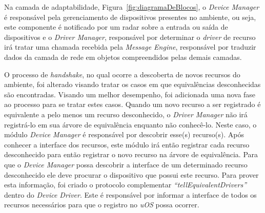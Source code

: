 Na camada de adaptabilidade, Figura~\ref{fig:diagramaDeBlocos}, o \emph{Device Manager} é responsável pela gerenciamento de dispositivos presentes no ambiente, ou seja, este componente é notificado por um radar sobre a entrada ou saída de dispositivos e o \emph{Driver Manager}, responsável por determinar o \emph{driver} de recurso irá tratar uma chamada recebida pela \emph{Message Engine}, responsável por traduzir dados da camada de rede em objetos compreendidos pelas demais camadas.

O processo de \emph{handshake}, no qual ocorre a descoberta de novos recursos do ambiente, foi alterado visando tratar os casos em que equivalências desconhecidas são encontradas. Visando um melhor desempenho, foi adicionada uma nova fase ao processo para se tratar estes casos. Quando um novo recurso a ser registrado é equivalente a pelo menos um recurso desconhecido, o \emph{Driver Manager} não irá registrá-lo em sua árvore de equivalência enquanto não conhecê-lo. Neste caso, o módulo \emph{Device Manager} é responsável por descobrir esse(s) recurso(s). Após conhecer a interface dos recursos, este módulo irá então registrar cada recurso desconhecido para então registrar o novo recurso na árvore de equivalência. Para que o \emph{Device Manager} possa descobrir a interface de um determinado recurso desconhecido ele deve procurar o dispositivo que possui este recurso. Para prover esta informação, foi criado o protocolo complementar \emph{``tellEquivalentDrivers''} dentro do \emph{Device Driver}. Este é responsável por informar a interface de todos os recursos necessários para que o registro no \emph{uOS} possa ocorrer.

